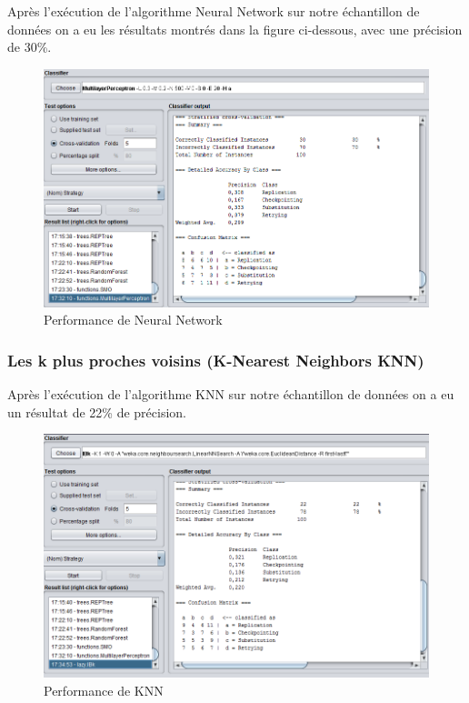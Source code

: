 Après l'exécution de l'algorithme Neural Network sur notre échantillon de données on a eu les résultats montrés dans la figure ci-dessous, avec une précision de 30\%.

\begin{figure}[H]
\begin{center}
\includegraphics[width=0.8\linewidth]{images/perfNN.PNG}
\end{center}
\caption{Performance de Neural Network}
\label{fig:19}
\end{figure}

\subsubsection{Les k plus proches voisins (K-Nearest Neighbors KNN)}
Après l'exécution de l'algorithme KNN sur notre échantillon de données on a eu un résultat de 22\% de précision.

\begin{figure}[H]
\begin{center}
\includegraphics[width=0.8\linewidth]{images/perfKNN.PNG}
\end{center}
\caption{Performance de KNN}
\label{fig:20}
\end{figure}


